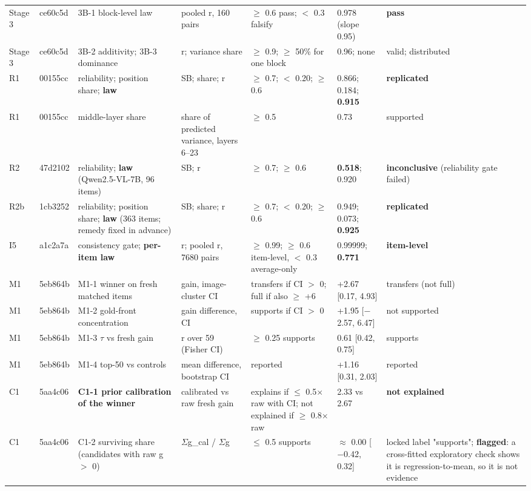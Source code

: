 \begin{longtable}{p{1.2cm}p{1.3cm}p{3.8cm}p{2.1cm}p{2.1cm}p{2.4cm}p{2.7cm}}
Stage 3 & ce60c5d & 3B-1 block-level law & pooled r, 160 pairs & $\ge$ 0.6 pass; $<$ 0.3 falsify & 0.978 (slope 0.95) & \textbf{pass} \\
Stage 3 & ce60c5d & 3B-2 additivity; 3B-3 dominance & r; variance share & $\ge$ 0.9; $\ge$ 50\% for one block & 0.96; none & valid; distributed \\
R1 & 00155cc & reliability; position share; \textbf{law} & SB; share; r & $\ge$ 0.7; $<$ 0.20; $\ge$ 0.6 & 0.866; 0.184; \textbf{0.915} & \textbf{replicated} \\
R1 & 00155cc & middle-layer share & share of predicted variance, layers 6--23 & $\ge$ 0.5 & 0.73 & supported \\
R2 & 47d2102 & reliability; \textbf{law} (Qwen2.5-VL-7B, 96 items) & SB; r & $\ge$ 0.7; $\ge$ 0.6 & \textbf{0.518}; 0.920 & \textbf{inconclusive} (reliability gate failed) \\
R2b & 1cb3252 & reliability; position share; \textbf{law} (363 items; remedy fixed in advance) & SB; share; r & $\ge$ 0.7; $<$ 0.20; $\ge$ 0.6 & 0.949; 0.073; \textbf{0.925} & \textbf{replicated} \\
I5 & a1c2a7a & consistency gate; \textbf{per-item law} & r; pooled r, 7680 pairs & $\ge$ 0.99; $\ge$ 0.6 item-level, $<$ 0.3 average-only & 0.99999; \textbf{0.771} & \textbf{item-level} \\
M1 & 5eb864b & M1-1 winner on fresh matched items & gain, image-cluster CI & transfers if CI $>$ 0; full if also $\ge$ +6 & +2.67 [0.17, 4.93] & transfers (not full) \\
M1 & 5eb864b & M1-2 gold-front concentration & gain difference, CI & supports if CI $>$ 0 & +1.95 [$-$2.57, 6.47] & not supported \\
M1 & 5eb864b & M1-3 $\tau$ vs fresh gain & r over 59 (Fisher CI) & $\ge$ 0.25 supports & 0.61 [0.42, 0.75] & supports \\
M1 & 5eb864b & M1-4 top-50 vs controls & mean difference, bootstrap CI & reported & +1.16 [0.31, 2.03] & reported \\
C1 & 5aa4c06 & \textbf{C1-1 prior calibration of the winner} & calibrated vs raw fresh gain & explains if $\le$ 0.5$\times$raw with CI; not explained if $\ge$ 0.8$\times$raw & 2.33 vs 2.67 & \textbf{not explained} \\
C1 & 5aa4c06 & C1-2 surviving share (candidates with raw g $>$ 0) & $\Sigma$g\_cal / $\Sigma$g & $\le$ 0.5 supports & $\approx$ 0.00 [$-$0.42, 0.32] & locked label "supports"; \textbf{flagged}: a cross-fitted exploratory check shows it is regression-to-mean, so it is not evidence \\

\end{longtable}
